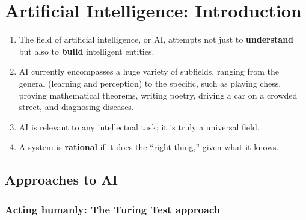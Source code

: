 \chapter{Artificial Intelligence: Introduction}\label{Artificial Intelligence: Introduction}

\begin{enumerate}
    \item The field of artificial intelligence, or AI, attempts not just to \textbf{understand} but also to \textbf{build} intelligent entities.
    \hfill \cite{ai/book/Artificial-Intelligence-A-Modern-Approach/Russell-Norvig}

    \item AI currently encompasses a huge variety of subfields, ranging from the general (learning and perception) to the specific, such as playing chess, proving mathematical theorems, writing poetry, driving a car on a crowded street, and diagnosing diseases.    
    \hfill \cite{ai/book/Artificial-Intelligence-A-Modern-Approach/Russell-Norvig}

    \item AI is relevant to any intellectual task; it is truly a universal field.
    \hfill \cite{ai/book/Artificial-Intelligence-A-Modern-Approach/Russell-Norvig}

    \item A system is \textbf{rational} if it does the “right thing,” given what it knows.
    \hfill \cite{ai/book/Artificial-Intelligence-A-Modern-Approach/Russell-Norvig}
\end{enumerate}






\section{Approaches to AI}\label{Artificial Intelligence: Introduction/Approaches to AI}

\subsection{Acting humanly: The Turing Test approach}\label{Artificial Intelligence: Introduction/Approaches to AI/Acting humanly: The Turing Test approach}


